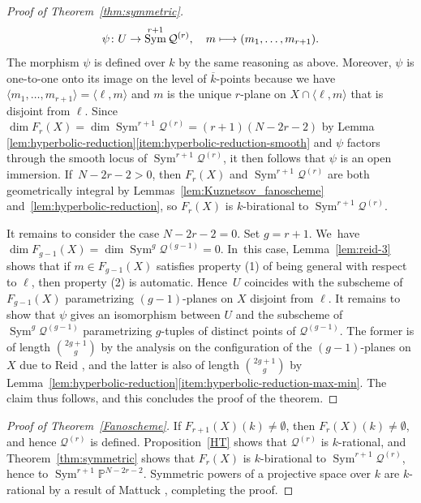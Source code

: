 \documentclass[JEP,XML,SOM,Unicode,NoEqCountersInSection,published]{cedram}
\newcommand\mto{\mathchoice{\longmapsto}{\mapsto}{\mapsto}{\mapsto}}
\theoremstyle{plain}
\theoremstyle{definition}
\DeclareMathOperator{\Sym}{Sym}
\newcommand{\kbar}{{\overline{k}}}
\renewcommand\P{\mathbb{P}}
\begin{document}
\begin{proof}[Proof of Theorem~\ref{thm:symmetric}]
\[
\psi\colon U\to \Sym^{r+1}\mathcal{Q}^{(r)},\quad
m\mto (m_1,\dots, m_{r+1}).
\]
The morphism $\psi$ is defined over $k$ by the same reasoning as above.
Moreover, $\psi$ is one-to-one onto its image on the level of $\kbar$-points
because we have $\langle m_1,\dots, m_{r+1}\rangle =\langle \ell,m\rangle$ and $m$ is the unique $r$-plane on $X\cap \langle \ell,m\rangle$ that is disjoint from $\ell$.
Since $\dim F_r(X) = \dim \Sym^{r+1}\mathcal{Q}^{(r)}=(r+1)(N-2r-2)$ by Lemma \ref{lem:hyperbolic-reduction}\eqref{item:hyperbolic-reduction-smooth}
and $\psi$ factors through the smooth locus of $\Sym^{r+1}\mathcal{Q}^{(r)}$,
it then follows that
$\psi$ is an open immersion. If~\hbox{$N-2r-2>0$}, then $F_r(X)$ and $\Sym^{r+1}\mathcal{Q}^{(r)}$ are both geometrically integral by Lemmas~\ref{lem:Kuznetsov_fanoscheme} and~\ref{lem:hyperbolic-reduction}, so $F_r(X)$ is $k$\nobreakdash-birational to $\Sym^{r+1}\mathcal{Q}^{(r)}$.

It remains to consider the case $N-2r-2=0$. Set $g=r+1$. We~have $\dim F_{g-1}(X)=\dim \Sym^{g}\mathcal{Q}^{(g-1)}=0$. In~this case, Lemma~\ref{lem:reid-3} shows that if $m\in F_{g-1}(X)$ satisfies property (1) of being general with respect to \(\ell\), then property (2) is automatic.
Hence~$U$ coincides with the subscheme of $F_{g-1}(X)$ parametrizing $(g-1)$-planes on $X$ disjoint from $\ell$.
It remains to show that $\psi$ gives an isomorphism between $U$ and the subscheme of $\Sym^{g}\mathcal{Q}^{(g-1)}$ parametrizing $g$-tuples of distinct points of $\mathcal{Q}^{(g-1)}$.
The former is of length $\binom{2g+1}{g}$ by the analysis on the configuration of the $(g-1)$-planes on $X$ due to Reid \cite[Th.\,3.8]{Reid-thesis},
and the latter is also of length $\binom{2g+1}{g}$
by Lemma~\ref{lem:hyperbolic-reduction}\eqref{item:hyperbolic-reduction-max-min}. The claim thus follows, and this concludes the proof of the theorem.
\end{proof}
\begin{proof}[Proof of Theorem~\ref{Fanoscheme}]
If $F_{r+1}(X)(k)\neq \emptyset$, then $F_r(X)(k)\neq \emptyset$, and hence $\mathcal{Q}^{(r)}$ is defined.
Proposition~\ref{HT} shows that $\mathcal{Q}^{(r)}$ is $k$\nobreakdash-rational, and
Theorem~\ref{thm:symmetric}
shows that $F_r(X)$ is $k$\nobreakdash-birational to
$\Sym^{r+1}\mathcal{Q}^{(r)}$, hence to $\Sym^{r+1}\P^{N-2r-2}$.
Symmetric powers of a projective space over $k$ are $k$\nobreakdash-rational by a result of Mattuck \cite{Mattuck69}, completing the proof.
\end{proof}
\end{document}
